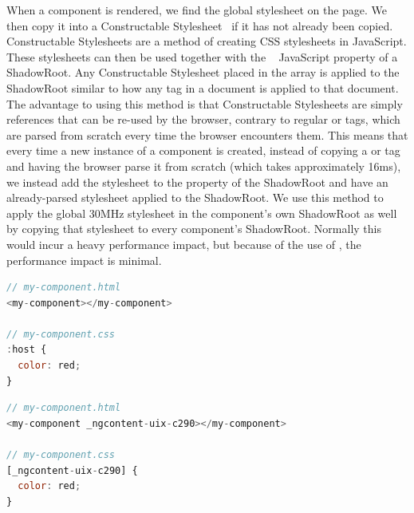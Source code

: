{}{
  When a component is rendered, we find the global stylesheet on the page. We then copy it into a Constructable Stylesheet~ if it has not already been copied. Constructable Stylesheets are a method of creating CSS stylesheets in JavaScript. These stylesheets can then be used together with the ~ JavaScript property of a ShadowRoot. Any Constructable Stylesheet placed in the  array is applied to the ShadowRoot similar to how any  tag in a document is applied to that document. The advantage to using this method is that Constructable Stylesheets are simply references that can be re-used by the browser, contrary to regular  or  tags, which are parsed from scratch every time the browser encounters them. This means that every time a new instance of a component is created, instead of copying a  or  tag and having the browser parse it from scratch (which takes approximately 16ms), we instead add the stylesheet to the  property of the ShadowRoot and have an already-parsed stylesheet applied to the ShadowRoot. We use this method to apply the global 30MHz stylesheet in the component's own ShadowRoot as well by copying that stylesheet to every component's ShadowRoot. Normally this would incur a heavy performance impact, but because of the use of , the performance impact is minimal.

}

\begin{lstlisting}[language={JavaScript},caption={An example of uncompiled source code for a component},label={lst:case-study:component-css-source}]
// my-component.html
<my-component></my-component>

// my-component.css
:host {
  color: red;
}
\end{lstlisting}

\begin{lstlisting}[language={JavaScript},caption={An example of compiled code for the component in Listing~\ref{lst:case-study:component-css-source}.},label={lst:case-study:component-css-compiled}]
// my-component.html
<my-component _ngcontent-uix-c290></my-component>

// my-component.css
[_ngcontent-uix-c290] {
  color: red;
}
\end{lstlisting}


